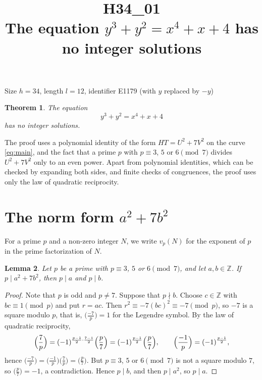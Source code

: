 \documentclass[11pt]{article}
\title{\textbf{H34\_01}\\[4pt] The equation $y^3+y^2=x^4+x+4$ has no integer solutions}
\author{}
\date{}
\newtheorem{theorem}{Theorem}
\newtheorem{lemma}[theorem]{Lemma}
\newcommand{\Z}{\mathbb{Z}}
\begin{document}
\maketitle
\vspace{-8ex}
\begin{center}
Size $h=34$, length $l=12$, identifier E1179 (with $y$ replaced by $-y$)
\end{center}

\begin{theorem}\label{thm:main}
The equation
\begin{equation}\label{eq:main}
y^3+y^2=x^4+x+4
\end{equation}
has no integer solutions.
\end{theorem}

The proof uses a polynomial identity of the form $HT=U^2+7V^2$ on the curve \eqref{eq:main}, and the fact that a prime $p$ with $p\equiv3$, $5$ or $6\pmod7$ divides $U^2+7V^2$ only to an even power. Apart from polynomial identities, which can be checked by expanding both sides, and finite checks of congruences, the proof uses only the law of quadratic reciprocity.

\section{\texorpdfstring{The norm form $a^2+7b^2$}{The norm form}}

For a prime $p$ and a non-zero integer $N$, we write $v_p(N)$ for the exponent of $p$ in the prime factorization of $N$.

\begin{lemma}\label{lem:divides}
Let $p$ be a prime with $p\equiv3$, $5$ or $6\pmod7$, and let $a,b\in\Z$. If $p\mid a^2+7b^2$, then $p\mid a$ and $p\mid b$.
\end{lemma}

\begin{proof}
Note that $p$ is odd and $p\neq7$. Suppose that $p\nmid b$. Choose $c\in\Z$ with $bc\equiv1\pmod p$ and put $r=ac$. Then $r^2\equiv-7(bc)^2\equiv-7\pmod p$, so $-7$ is a square modulo $p$, that is, $\bigl(\frac{-7}{p}\bigr)=1$ for the Legendre symbol. By the law of quadratic reciprocity,
\[
\Bigl(\frac{7}{p}\Bigr)=(-1)^{\frac{p-1}2\cdot\frac{7-1}2}\Bigl(\frac{p}{7}\Bigr)=(-1)^{\frac{p-1}2}\Bigl(\frac{p}{7}\Bigr),
\qquad
\Bigl(\frac{-1}{p}\Bigr)=(-1)^{\frac{p-1}2},
\]
hence $\bigl(\frac{-7}p\bigr)=\bigl(\frac{-1}p\bigr)\bigl(\frac7p\bigr)=\bigl(\frac p7\bigr)$. But $p\equiv3$, $5$ or $6\pmod7$ is not a square modulo $7$, so $\bigl(\frac p7\bigr)=-1$, a contradiction. Hence $p\mid b$, and then $p\mid a^2$, so $p\mid a$.
\end{proof}
\end{document}
